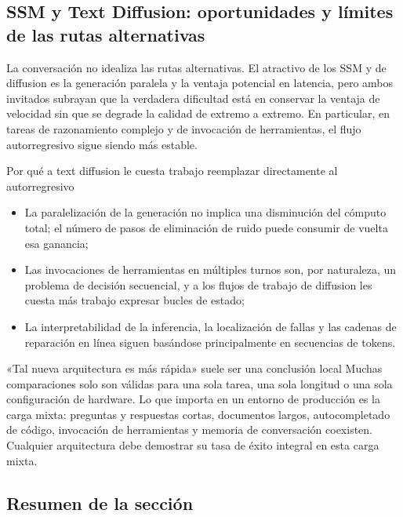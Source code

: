 \documentclass[a4paper]{article}
\begin{document}
\subsection{SSM y Text Diffusion: oportunidades y límites de las rutas alternativas}

La conversación no idealiza las rutas alternativas. El atractivo de los SSM y de diffusion es la generación paralela y la ventaja potencial en latencia, pero ambos invitados subrayan que la verdadera dificultad está en conservar la ventaja de velocidad sin que se degrade la calidad de extremo a extremo. En particular, en tareas de razonamiento complejo y de invocación de herramientas, el flujo autorregresivo sigue siendo más estable.

\begin{knowledgebox}{Por qué a text diffusion le cuesta trabajo reemplazar directamente al autorregresivo}
\begin{itemize}[leftmargin=1.5em]
    \item La paralelización de la generación no implica una disminución del cómputo total; el número de pasos de eliminación de ruido puede consumir de vuelta esa ganancia;
    \item Las invocaciones de herramientas en múltiples turnos son, por naturaleza, un problema de decisión secuencial, y a los flujos de trabajo de diffusion les cuesta más trabajo expresar bucles de estado;
    \item La interpretabilidad de la inferencia, la localización de fallas y las cadenas de reparación en línea siguen basándose principalmente en secuencias de tokens.
\end{itemize}
\end{knowledgebox}

\begin{warningbox}{«Tal nueva arquitectura es más rápida» suele ser una conclusión local}
Muchas comparaciones solo son válidas para una sola tarea, una sola longitud o una sola configuración de hardware. Lo que importa en un entorno de producción es la carga mixta: preguntas y respuestas cortas, documentos largos, autocompletado de código, invocación de herramientas y memoria de conversación coexisten. Cualquier arquitectura debe demostrar su tasa de éxito integral en esta carga mixta.
\end{warningbox}

\subsection{Resumen de la sección}
\end{document}
